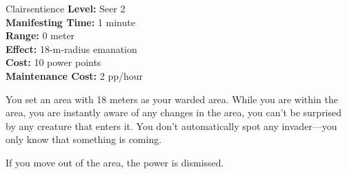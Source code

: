 {Clairsentience}
{
	\textbf{Level:}
	Seer 2\\
	\textbf{Manifesting Time:}
	1 minute\\
	\textbf{Range:}
	0 meter\\
	\textbf{Effect:}
	18-m-radius emanation\\
	\textbf{Cost:}
	10 power points\\
	\textbf{Maintenance Cost:}
	2 pp/hour\\
}
{
	You set an area with 18 meters as your warded area. While you are within the area, you are instantly aware of any changes in the area, you can't be surprised by any creature that enters it. You don't automatically spot any invader---you only know that something is coming.

	If you move out of the area, the power is dismissed.
}